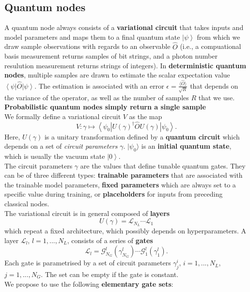 \documentclass[aps,pra,10pt,twocolumn,groupedaddress,nofootinbib]{revtex4-1}
\theoremstyle{plain}
\newcommand{\ket}[1]{\ensuremath{\left| #1 \right \rangle}}
\newcommand{\bra}[1]{\ensuremath{\left \langle #1 \right |}}
\renewcommand{\L}{\mathcal{L}}
\newcommand{\G}{\mathcal{G}}
\begin{document}
\subsection{Quantum nodes}
A quantum node always consists of a \textbf{variational circuit} that takes inputs and model parameters and maps them to a final quantum state $\ket{\psi}$ from which we draw sample observations with regards to an observable $\hat{O}$ (i.e., a compuational basis measurement returns samples of bit strings, and a photon number resulution measurement returns strings of integers). In \textbf{deterministic quantum nodes}, multiple samples are drawn to estimate the scalar expectation value $\bra{\psi} \hat{O} \ket{\psi}$. The estimation is associated with an error $\epsilon = \frac{\langle \hat{O} \rangle}{\sqrt{R}}$ that depends on the variance of the operator, as well as the number of samples $R$ that we use. \textbf{Probabilistic quantum nodes simply return a single sample} \\

We formally define a variational circuit $V$ as the map
\[V: \gamma \mapsto \bra{\psi_0} U(\gamma)^{\dagger}  \hat{O} U(\gamma) \ket{\psi_0}. \]
Here, $U(\gamma)$ is a unitary transformation defined by a \textbf{quantum circuit} which depends on a set of \textit{circuit parameters} $\gamma$. $|\psi_0 \rangle$ is an \textbf{initial quantum state}, which is usually the vacuum state $\ket{0}$.\\

The circuit parameters $\gamma$ are the values that define tunable quantum gates. They can be of three different types: \textbf{trainable parameters} that are associated with the trainable model parameters, \textbf{fixed parameters} which are always set to a specific value during training, or \textbf{placeholders} for inputs from preceding classical nodes.\\

The variational circuit is in general composed of \textbf{layers}
\[ U (\gamma) = \L_{N_L} \cdots \L_{1}\]
which repeat a fixed architecture, which possibly depends on hyperparameters. A layer $\L_l$, $l=1,...,N_L$, consists of a series of \textbf{gates}
\[\L_l = \G^l_{N_G}(\gamma^l_{N_G}) \cdots \G^l_1(\gamma^l_1). \]
Each gate is parametrised by a set of circuit parameters
$\gamma^i_j$, $i = 1,...,N_L$, $j=1,...,N_G$. The set can be empty if the gate is constant.\\

We propose to use the following \textbf{elementary gate sets}:
\end{document}
